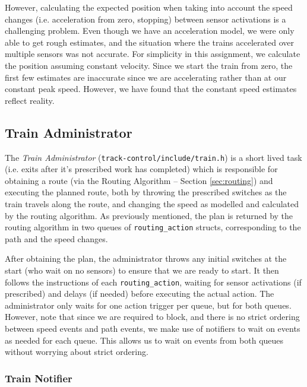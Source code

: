 \documentclass[12pt, titlepage]{article}
\begin{document}
    However, calculating the expected position when taking into account the speed changes (i.e. acceleration from zero, stopping) between sensor activations is a challenging problem. Even though we have an acceleration model, we were only able to get rough estimates, and the situation where the trains accelerated over multiple sensors was not accurate. For simplicity in this assignment, we calculate the position assuming constant velocity. Since we start the train from zero, the first few estimates are inaccurate since we are accelerating rather than at our constant peak speed. However, we have found that the constant speed estimates reflect reality.

    \subsection{Train Administrator}
    \label{sec:train}
    
    The \emph{Train Administrator} (\verb`track-control/include/train.h`) is a short lived task (i.e. exits after it's prescribed work has completed) which is responsible for obtaining a route (via the Routing Algorithm -- Section \ref{sec:routing}) and executing the planned route, both by throwing the prescribed switches as the train travels along the route, and changing the speed as modelled and calculated by the routing algorithm. As previously mentioned, the plan is returned by the routing algorithm in two queues of \verb`routing_action` structs, corresponding to the path and the speed changes.
    
    After obtaining the plan, the administrator throws any initial switches at the start (who wait on no sensors) to ensure that we are ready to start. It then follows the instructions of each \verb`routing_action`, waiting for sensor activations (if prescribed) and delays (if needed) before executing the actual action. The administrator only waits for one action trigger per queue, but for both queues. However, note that since we are required to block, and there is no strict ordering between speed events and path events, we make use of notifiers to wait on events as needed for each queue. This allows us to wait on events from both queues without worrying about strict ordering.

    \subsubsection{Train Notifier}
    \label{sec:train-notif}
    
\end{document}
